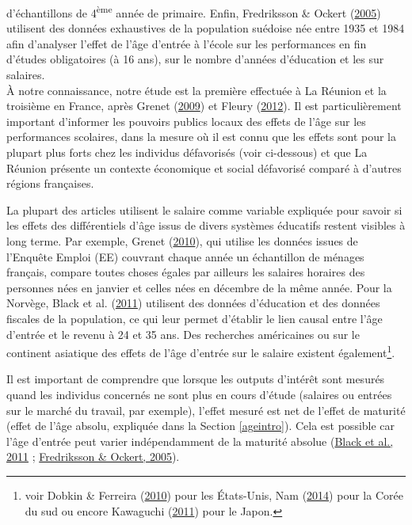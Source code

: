 \documentclass[
]{book}
\begin{document}
d'échantillons de 4\textsuperscript{ème} année de primaire. Enfin, Fredriksson \& Ockert (\protect\hyperlink{ref-FRE:OCK:05}{2005}) utilisent des données exhaustives de la population suédoise née entre 1935 et 1984 afin d'analyser l'effet de l'âge d'entrée à l'école sur les performances en fin d'études obligatoires (à 16 ans), sur le nombre d'années d'éducation et les sur salaires.\\
À notre connaissance, notre étude est la première effectuée à La Réunion et la troisième en France, après Grenet (\protect\hyperlink{ref-GRE:09}{2009}) et Fleury (\protect\hyperlink{ref-FLE:12}{2012}). Il est particulièrement important d'informer les pouvoirs publics locaux des effets de l'âge sur les performances scolaires, dans la mesure où il est connu que les effets sont pour la plupart plus forts chez les individus défavorisés (voir ci-dessous) et que La Réunion présente un contexte économique et social défavorisé comparé à d'autres régions françaises.

\quad La plupart des articles utilisent le salaire comme variable expliquée pour savoir si les effets des différentiels d'âge issus de divers systèmes éducatifs restent visibles à long terme. Par exemple, Grenet (\protect\hyperlink{ref-GRE:10}{2010}), qui utilise les données issues de l'Enquête Emploi (EE) couvrant chaque année un échantillon de ménages français, compare toutes choses égales par ailleurs les salaires horaires des personnes nées en janvier et celles nées en décembre de la même année. Pour la Norvège, Black et al. (\protect\hyperlink{ref-BLA:eal:11}{2011}) utilisent des données d'éducation et des données fiscales de la population, ce qui leur permet d'établir le lien causal entre l'âge d'entrée et le revenu à 24 et 35 ans. Des recherches américaines ou sur le continent asiatique des effets de l'âge d'entrée sur le salaire existent également\footnote{voir Dobkin \& Ferreira (\protect\hyperlink{ref-DOB:FER:10}{2010}) pour les États-Unis, Nam (\protect\hyperlink{ref-NAM:14}{2014}) pour la Corée du sud ou encore Kawaguchi (\protect\hyperlink{ref-KAW:11}{2011}) pour le Japon.}.

\quad Il est important de comprendre que lorsque les outputs d'intérêt sont mesurés quand les individus concernés ne sont plus en cours d'étude (salaires ou entrées sur le marché du travail, par exemple), l'effet mesuré est net de l'effet de maturité (effet de l'âge absolu, expliquée dans la Section \ref{ageintro}). Cela est possible car l'âge d'entrée peut varier indépendamment de la maturité absolue (\protect\hyperlink{ref-BLA:eal:11}{Black et al., 2011} ; \protect\hyperlink{ref-FRE:OCK:05}{Fredriksson \& Ockert, 2005}).
\end{document}

